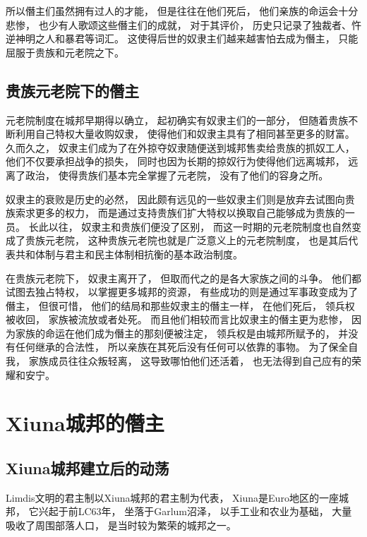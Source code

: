 \documentclass[12pt, a4paper]{ctexart}
\begin{document}
        所以僭主们虽然拥有过人的才能，
        但是往往在他们死后，
        他们亲族的命运会十分悲惨，
        也少有人歌颂这些僭主们的成就，
        对于其评价，
        历史只记录了独裁者、忤逆神明之人和暴君等词汇。
        这使得后世的奴隶主们越来越害怕去成为僭主，
        只能屈服于贵族和元老院之下。
    \subsection{贵族元老院下的僭主}
        元老院制度在城邦早期得以确立，
        起初确实有奴隶主们的一部分，
        但随着贵族不断利用自己特权大量收购奴隶，
        使得他们和奴隶主具有了相同甚至更多的财富。
        久而久之，
        奴隶主们成为了在外掠夺奴隶随便送到城邦售卖给贵族的抓奴工人，
        他们不仅要承担战争的损失，
        同时也因为长期的掠奴行为使得他们远离城邦，
        远离了政治，
        使得贵族们基本完全掌握了元老院，
        没有了他们的容身之所。

        奴隶主的衰败是历史的必然，
        因此颇有远见的一些奴隶主们则是放弃去试图向贵族索求更多的权力，
        而是通过支持贵族们扩大特权以换取自己能够成为贵族的一员。
        长此以往，
        奴隶主和贵族们便没了区别，
        而这一时期的元老院制度也自然变成了贵族元老院，
        这种贵族元老院也就是广泛意义上的元老院制度，
        也是其后代表共和体制与君主和民主体制相抗衡的基本政治制度。

        在贵族元老院下，
        奴隶主离开了，
        但取而代之的是各大家族之间的斗争。
        他们都试图去独占特权，
        以掌握更多城邦的资源，
        有些成功的则是通过军事政变成为了僭主，
        但很可惜，
        他们的结局和那些奴隶主的僭主一样，
        在他们死后，
        领兵权被收回，
        家族被流放或者处死。
        而且他们相较而言比奴隶主的僭主更为悲惨，
        因为家族的命运在他们成为僭主的那刻便被注定，
        领兵权是由城邦所赋予的，
        并没有任何继承的合法性，
        所以亲族在其死后没有任何可以依靠的事物。
        为了保全自我，
        家族成员往往众叛轻离，
        这导致哪怕他们还活着，
        也无法得到自己应有的荣耀和安宁。
\section{Xiuna城邦的僭主}
    \subsection{Xiuna城邦建立后的动荡}
        Limdis文明的君主制以Xiuna城邦的君主制为代表，
        Xiuna是Euro地区的一座城邦，
        它兴起于前LC63年，
        坐落于Garlum沼泽，
        以手工业和农业为基础，
        大量吸收了周围部落人口，
        是当时较为繁荣的城邦之一。
\end{document}
